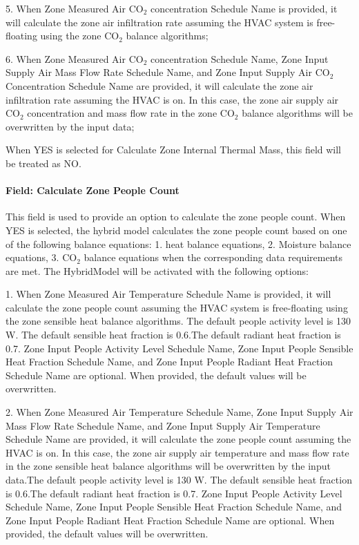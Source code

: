 5. When Zone Measured Air CO$_2$ concentration Schedule Name is provided, it will calculate the zone air infiltration rate assuming the HVAC system is free-floating using the zone CO$_2$ balance algorithms;

6. When Zone Measured Air CO$_2$ concentration Schedule Name, Zone Input Supply Air Mass Flow Rate Schedule Name, and Zone Input Supply Air CO$_2$ Concentration Schedule Name are provided, it will calculate the zone air infiltration rate assuming the HVAC is on. In this case, the zone air supply air CO$_2$ concentration and mass flow rate in the zone CO$_2$ balance algorithms will be overwritten by the input data;

When YES is selected for Calculate Zone Internal Thermal Mass, this field will be treated as NO.

\paragraph{Field: Calculate Zone People Count}\label{field-calculate-zone-people-count-rate-hm}

This field is used to provide an option to calculate the zone people count.
When YES is selected, the hybrid model calculates the zone people count based on one of the following balance equations: 1. heat balance equations, 2. Moisture balance equations, 3. CO$_2$ balance equations when the corresponding data requirements are met. The HybridModel will be activated with the following options:

1. When Zone Measured Air Temperature Schedule Name is provided, it will calculate the zone people count assuming the HVAC system is free-floating using the zone sensible heat balance algorithms. The default people activity level is 130 W. The default sensible heat fraction is 0.6.The default radiant heat fraction is 0.7. Zone Input People Activity Level Schedule Name, Zone Input People Sensible Heat Fraction Schedule Name, and Zone Input People Radiant Heat Fraction Schedule Name are optional. When provided, the default values will be overwritten.

2. When Zone Measured Air Temperature Schedule Name, Zone Input Supply Air Mass Flow Rate Schedule Name, and Zone Input Supply Air Temperature Schedule Name are provided, it will calculate the zone people count assuming the HVAC is on. In this case, the zone air supply air temperature and mass flow rate in the zone sensible heat balance algorithms will be overwritten by the input data.The default people activity level is 130 W. The default sensible heat fraction is 0.6.The default radiant heat fraction is 0.7. Zone Input People Activity Level Schedule Name, Zone Input People Sensible Heat Fraction Schedule Name, and Zone Input People Radiant Heat Fraction Schedule Name are optional. When provided, the default values will be overwritten.

